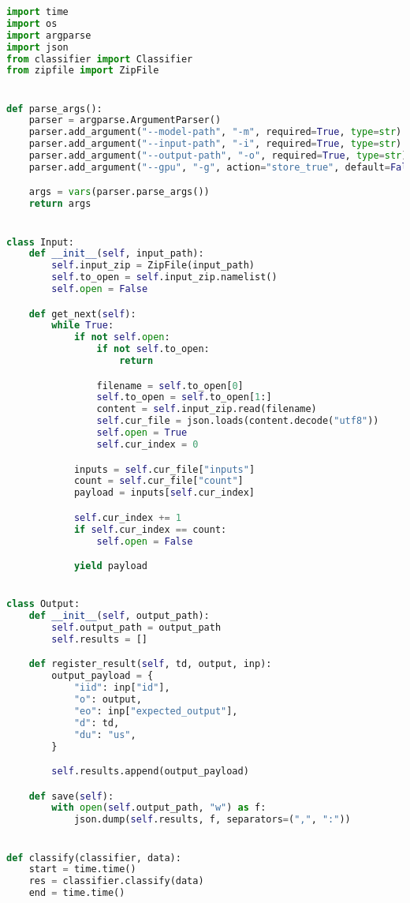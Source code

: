 \begin{lstlisting}[language=Python, caption=Arquivo principal de execução das medições em Python, label={lst:main_python}]
import time
import os
import argparse
import json
from classifier import Classifier
from zipfile import ZipFile


def parse_args():
    parser = argparse.ArgumentParser()
    parser.add_argument("--model-path", "-m", required=True, type=str)
    parser.add_argument("--input-path", "-i", required=True, type=str)
    parser.add_argument("--output-path", "-o", required=True, type=str)
    parser.add_argument("--gpu", "-g", action="store_true", default=False)

    args = vars(parser.parse_args())
    return args


class Input:
    def __init__(self, input_path):
        self.input_zip = ZipFile(input_path)
        self.to_open = self.input_zip.namelist()
        self.open = False

    def get_next(self):
        while True:
            if not self.open:
                if not self.to_open:
                    return

                filename = self.to_open[0]
                self.to_open = self.to_open[1:]
                content = self.input_zip.read(filename)
                self.cur_file = json.loads(content.decode("utf8"))
                self.open = True
                self.cur_index = 0

            inputs = self.cur_file["inputs"]
            count = self.cur_file["count"]
            payload = inputs[self.cur_index]

            self.cur_index += 1
            if self.cur_index == count:
                self.open = False

            yield payload


class Output:
    def __init__(self, output_path):
        self.output_path = output_path
        self.results = []

    def register_result(self, td, output, inp):
        output_payload = {
            "iid": inp["id"],
            "o": output,
            "eo": inp["expected_output"],
            "d": td,
            "du": "us",
        }

        self.results.append(output_payload)

    def save(self):
        with open(self.output_path, "w") as f:
            json.dump(self.results, f, separators=(",", ":"))


def classify(classifier, data):
    start = time.time()
    res = classifier.classify(data)
    end = time.time()


\end{lstlisting}
